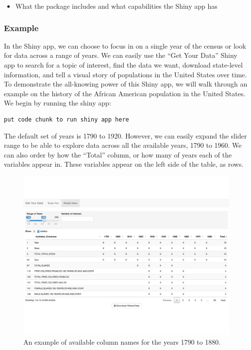 \documentclass[11pt,]{article}
\providecommand{\tightlist}{%
  \setlength{\itemsep}{0pt}\setlength{\parskip}{0pt}}
\begin{document}
\begin{itemize}
\tightlist
\item
  What the package includes and what capabilities the Shiny app has
\end{itemize}

\subsubsection{Example}\label{example}

In the Shiny app, we can choose to focus in on a single year of the
census or look for data across a range of years. We can easily use the
``Get Your Data'' Shiny app to search for a topic of interest, find the
data we want, download state-level information, and tell a visual story
of populations in the United States over time. To demonstrate the
all-knowing power of this Shiny app, we will walk through an example on
the history of the African American population in the United States. We
begin by running the shiny app:

\begin{verbatim}
put code chunk to run shiny app here
\end{verbatim}

The default set of years is 1790 to 1920. However, we can easily expand
the slider range to be able to explore data across all the available
years, 1790 to 1960. We can also order by how the ``Total'' column, or
how many of years each of the variables appear in. These variables
appear on the left side of the table, as rows.

\begin{figure}[htbp]
\centering
\includegraphics{./figures/app-sshot-1790-to-1880.pdf}
\caption{An example of available column names for the years 1790 to
1880.}
\end{figure}
\end{document}

